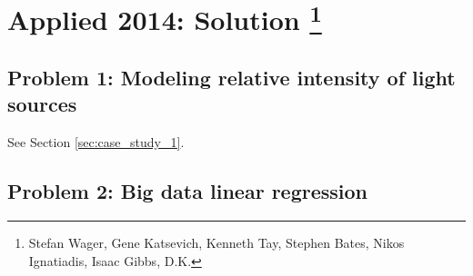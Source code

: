\section{Applied 2014: Solution \footnote{Stefan Wager, Gene Katsevich,  Kenneth Tay, Stephen Bates, Nikos Ignatiadis, Isaac Gibbs, D.K.}} \label{sec:2014 exam}

\subsection*{Problem 1: Modeling relative intensity of light sources}

See Section \ref{sec:case_study_1}.

\subsection*{Problem 2: Big data linear regression}

